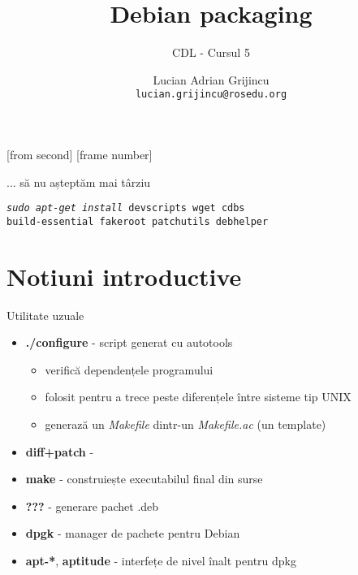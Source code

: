 \documentclass{beamer}
\title[Debian packaging]{Debian packaging}
\subtitle{CDL - Cursul 5}
\institute{ROSEdu}
\author{Lucian Adrian Grijincu \\ \texttt{lucian.grijincu@rosedu.org}}
\begin{document}
[from second]
[frame number]

\frame{\titlepage}

\frame{\tableofcontents}

\begin{frame}{... să nu așteptăm mai târziu}
  \begin{beamerboxesrounded}[lower=block body,shadow=true]{}
    \large {\texttt{\textit{sudo apt-get install} devscripts wget cdbs \\
      build-essential fakeroot patchutils debhelper}}
  \end{beamerboxesrounded}
\end{frame}


\section{Notiuni introductive}

\frame{\tableofcontents[currentsection]}


\begin{frame}{Utilitate uzuale}
  \begin{itemize}[<+->]
  \item \textbf{./configure} - script generat cu autotools
    \begin{itemize}
    \item verifică dependențele programului
    \item folosit pentru a trece peste diferențele între sisteme tip UNIX
    \item generază un \textit{Makefile} dintr-un \textit{Makefile.ac} (un template)
    \end{itemize}
  \item \textbf{diff+patch} - 
  \item \textbf{make} - construiește executabilul final din surse
  \item \textbf{???} - generare pachet .deb
  \item \textbf{dpgk} - manager de pachete pentru Debian
  \item \textbf{apt-*}, \textbf{aptitude} - interfețe de nivel înalt pentru dpkg
  \end{itemize}
\end{frame}
\end{document}
